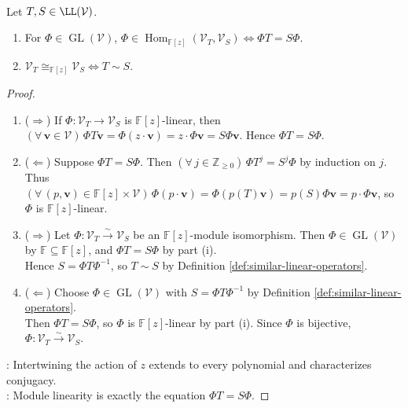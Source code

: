\begin{theorem} \label{thm:operator-similarity-iff-module-isomorphism} \\
Let $T,S\in\LL(\mathcal{V})$.
\begin{enumerate}[label=(\roman*)]
\setlength{\itemsep}{0pt}
\item For $\Phi\in\operatorname{GL}(\mathcal{V})$, $\Phi\in\operatorname{Hom}_{\mathbb{F}[z]}(\mathcal{V}_T,\mathcal{V}_S)\Longleftrightarrow\Phi T=S\Phi$.
\item $\mathcal{V}_T\cong_{\mathbb{F}[z]}\mathcal{V}_S\Longleftrightarrow T\sim S$.
\end{enumerate}
\begin{proof}
\begin{enumerate}[label=(\roman*)]
\setlength{\itemsep}{0pt}
\item[$(i)$] ($\Rightarrow$) If $\Phi:\mathcal{V}_T\to\mathcal{V}_S$ is $\mathbb{F}[z]$-linear, then $(\forall\,\mathbf{v}\in\mathcal{V})\,\Phi T\mathbf{v}=\Phi(z\cdot\mathbf{v})=z\cdot\Phi\mathbf{v}=S\Phi\mathbf{v}$. Hence $\Phi T=S\Phi$.
\item[$(i)$] ($\Leftarrow$) Suppose $\Phi T=S\Phi$. Then $(\forall\,j\in\mathbb{Z}_{\geq0})\,\Phi T^j=S^j\Phi$ by induction on $j$.\\
Thus $(\forall\,(p,\mathbf{v})\in\mathbb{F}[z]\times\mathcal{V})\,\Phi(p\cdot\mathbf{v})=\Phi(p(T)\mathbf{v})=p(S)\Phi\mathbf{v}=p\cdot\Phi\mathbf{v}$, so $\Phi$ is $\mathbb{F}[z]$-linear.
\item[$(ii)$] ($\Rightarrow$) Let $\Phi:\mathcal{V}_T\xrightarrow{\sim}\mathcal{V}_S$ be an $\mathbb{F}[z]$-module isomorphism. Then $\Phi\in\operatorname{GL}(\mathcal{V})$ by $\mathbb{F}\subseteq\mathbb{F}[z]$, and $\Phi T=S\Phi$ by part (i).\\
Hence $S=\Phi T\Phi^{-1}$, so $T\sim S$ by Definition \ref{def:similar-linear-operators}.
\item[$(ii)$] ($\Leftarrow$) Choose $\Phi\in\operatorname{GL}(\mathcal{V})$ with $S=\Phi T\Phi^{-1}$ by Definition \ref{def:similar-linear-operators}.\\
Then $\Phi T=S\Phi$, so $\Phi$ is $\mathbb{F}[z]$-linear by part (i). Since $\Phi$ is bijective, $\Phi:\mathcal{V}_T\xrightarrow{\sim}\mathcal{V}_S$.
\end{enumerate}
: Intertwining the action of $z$ extends to every polynomial and characterizes conjugacy.\\
: Module linearity is exactly the equation $\Phi T=S\Phi$.
\end{proof}
\end{theorem}

